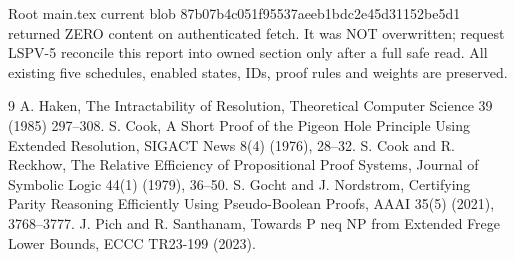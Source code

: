 \documentclass{article}
\begin{document}
Root main.tex current blob 87b07b4c051f95537aeeb1bdc2e45d31152be5d1 returned ZERO content on authenticated fetch. It was NOT overwritten; request LSPV-5 reconcile this report into owned section only after a full safe read. All existing five schedules, enabled states, IDs, proof rules and weights are preserved.

\begin{thebibliography}{9}
 A. Haken, The Intractability of Resolution, Theoretical Computer Science 39 (1985) 297--308.
 S. Cook, A Short Proof of the Pigeon Hole Principle Using Extended Resolution, SIGACT News 8(4) (1976), 28--32.
 S. Cook and R. Reckhow, The Relative Efficiency of Propositional Proof Systems, Journal of Symbolic Logic 44(1) (1979), 36--50.
 S. Gocht and J. Nordstrom, Certifying Parity Reasoning Efficiently Using Pseudo-Boolean Proofs, AAAI 35(5) (2021), 3768--3777.
 J. Pich and R. Santhanam, Towards P neq NP from Extended Frege Lower Bounds, ECCC TR23-199 (2023).
\end{thebibliography}
\end{document}
